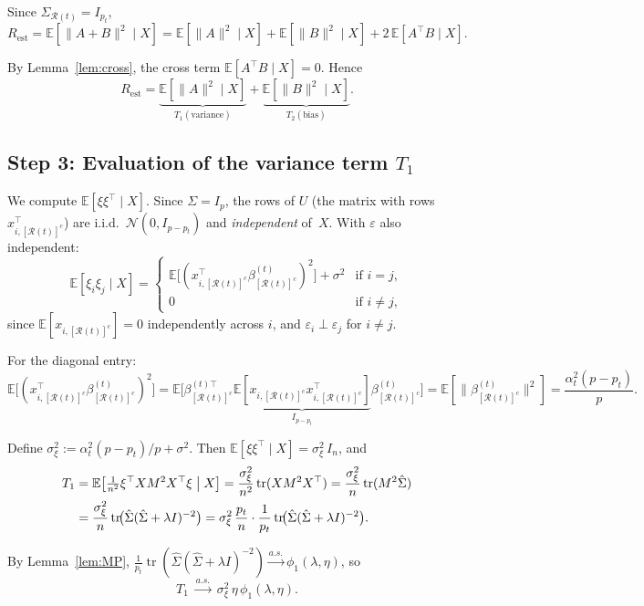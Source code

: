 \documentclass[11pt,a4paper]{article}
\theoremstyle{definition}
\DeclareMathOperator{\tr}{tr}
\newcommand{\E}{\mathbb{E}}
\newcommand{\N}{\mathcal{N}}
\newcommand{\cR}{\mathcal{R}}
\newcommand{\cRc}{[\cR(t)]^c}
\newcommand{\SigR}{\Sigma_{\cR(t)}}
\begin{document}
Since $\SigR=I_{p_t}$,
\[
  R_{\mathrm{est}}
  =\E[\|A+B\|^{2}\mid X]
  =\E[\|A\|^{2}\mid X]
  +\E[\|B\|^{2}\mid X]
  +2\,\E[A^{\top}B\mid X].
\]

By Lemma~\ref{lem:cross}, the cross term
$\E[A^{\top}B\mid X]=0$.  Hence
\begin{equation}\label{eq:Rest}
  R_{\mathrm{est}}
  =\underbrace{\E[\|A\|^{2}\mid X]}_{T_1(\text{variance})}
  +\underbrace{\E[\|B\|^{2}\mid X]}_{T_2(\text{bias})}.
\end{equation}

\subsection*{Step 3: Evaluation of the variance term $T_1$}

We compute $\E[\xi\xi^{\top}\mid X]$.  Since $\Sigma=I_p$, the rows
of $U$ (the matrix with rows $x_{i,\cRc}^{\top}$) are i.i.d.\
$\N(0,I_{p-p_t})$ and \emph{independent} of~$X$.  With $\varepsilon$
also independent:
\[
  \E[\xi_i\xi_j\mid X]
  =\begin{cases}
  \E\bigl[(x_{i,\cRc}^{\top}\beta^{(t)}_{\cRc})^{2}\bigr]+\sigma^{2}
  &\text{if }i=j,\\
  0 &\text{if }i\neq j,
  \end{cases}
\]
since $\E[x_{i,\cRc}]=0$ independently across $i$, and
$\varepsilon_i\perp\varepsilon_j$ for $i\neq j$.

For the diagonal entry:
\[
  \E\bigl[(x_{i,\cRc}^{\top}\beta^{(t)}_{\cRc})^{2}\bigr]
  =\E\bigl[\beta^{(t)\top}_{\cRc}
  \underbrace{\E[x_{i,\cRc}x_{i,\cRc}^{\top}]}_{I_{p-p_t}}
  \beta^{(t)}_{\cRc}\bigr]
  =\E[\|\beta^{(t)}_{\cRc}\|^{2}]
  =\frac{\alpha_t^{2}(p-p_t)}{p}.
\]

Define
$\sigma_\xi^{2}:=\alpha_t^{2}(p-p_t)/p+\sigma^{2}$.  Then
$\E[\xi\xi^{\top}\mid X]=\sigma_\xi^{2}\,I_n$, and
\begin{align}
  T_1
  &=\E\bigl[\tfrac{1}{n^{2}}\xi^{\top}XM^{2}X^{\top}\xi\;\big|\;X\bigr]
  =\frac{\sigma_\xi^{2}}{n^{2}}\tr(XM^{2}X^{\top})
  =\frac{\sigma_\xi^{2}}{n}\tr(M^{2}\hat\Sigma)
  \notag\\
  &=\frac{\sigma_\xi^{2}}{n}\tr\!\bigl(
  \hat\Sigma(\hat\Sigma+\lambda I)^{-2}\bigr)
  =\sigma_\xi^{2}\,\frac{p_t}{n}\cdot
  \frac{1}{p_t}\tr\!\bigl(\hat\Sigma(\hat\Sigma+\lambda I)^{-2}\bigr).
  \label{eq:T1}
\end{align}

By Lemma~\ref{lem:MP},
$\frac{1}{p_t}\tr(\hat\Sigma(\hat\Sigma+\lambda I)^{-2})
\xrightarrow{a.s.}\phi_1(\lambda,\eta)$, so
\begin{equation}\label{eq:T1asymp}
  T_1\;\xrightarrow{a.s.}\;
  \sigma_\xi^{2}\,\eta\,\phi_1(\lambda,\eta).
\end{equation}
\end{document}
